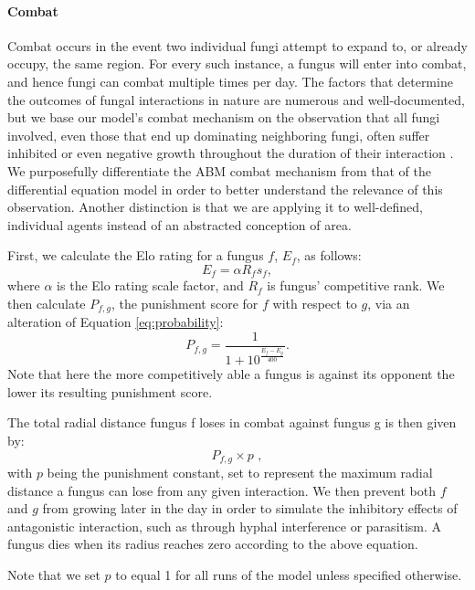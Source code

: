 \documentclass[12pt]{article}
\begin{document}
\paragraph{Combat} 
Combat occurs in the event two individual fungi attempt to expand to, or already occupy, the same region. For every such instance, a fungus will enter into combat, and hence fungi can combat multiple times per day.  The factors that determine the outcomes of fungal interactions in nature are numerous and well-documented, but we base our model's combat mechanism on the observation that all fungi involved, even those that end up dominating neighboring fungi, often suffer inhibited or even negative growth throughout the duration of their interaction \cite{combat}. We purposefully differentiate the ABM combat mechanism from that of the differential equation model in order to better understand the relevance of this observation. Another distinction is that we are applying it to well-defined, individual agents instead of an abstracted conception of area.

First, we calculate the Elo rating for a fungus $f$, $E_f$, as follows:
\[E_f=\alpha R_f s_f, \]
where $\alpha$ is the Elo rating scale factor, and $R_f$ is fungus' competitive rank. We then calculate $P_{f,g}$, the punishment score for $f$ with respect to $g$, via an alteration of Equation \eqref{eq:probability}:
\begin{equation*}
P_{f,g}=\dfrac{1}{1+10^\frac{E_f-E_g}{400}}.
\end{equation*}
Note that here the more competitively able a fungus is against its opponent the lower its resulting punishment score.


The total radial distance fungus f loses in combat against fungus g is then given by:
\[P_{f,g} \times p \, \, ,\]
with $p$ being  the punishment constant, set to represent the maximum radial distance a fungus can lose from any given interaction. We then prevent both $f$ and $g$ from growing later in the day in order to simulate the inhibitory effects of antagonistic interaction, such as through hyphal interference or parasitism. A fungus dies when its radius reaches zero according to the above equation.

Note that we set $p$ to equal 1 for all runs of the model unless specified otherwise.




\end{document}
